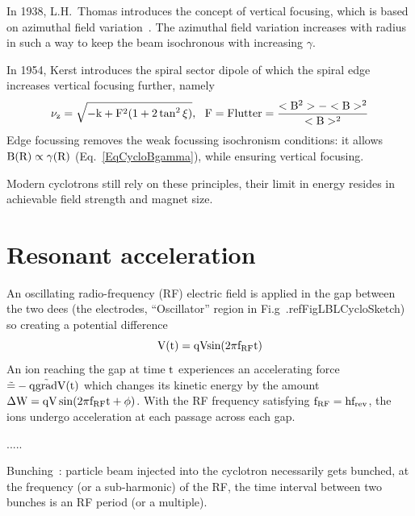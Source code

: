 In 1938, L.H.~Thomas introduces  the concept of vertical focusing, 
which is based on  azimuthal field variation~\cite{LHThomas}. 
The azimuthal field variation increases with radius in such a way to keep the beam isochronous with increasing $\gamma$.

In  1954, Kerst introduces the spiral sector dipole of which the spiral edge increases vertical focusing further, namely
\begin{equation} \rm
\label{EqCycloThomasFoc}
\nu_z = \sqrt{-k + F^2(1 + 2 \tan^2 \xi)}, ~ ~ {\rm F=Flutter} = \frac{<B^2> - <B>^2}{<B>^2}
\end{equation}
Edge focussing removes the weak focussing isochronism conditions: it allows  $\rm B(R)\propto\gamma(R)$ 
 (Eq.~\ref{EqCycloBgamma}), while  ensuring vertical focusing.  

  Modern cyclotrons still  rely on these principles,
their limit in energy resides in achievable field strength and magnet size. 



\section{Resonant acceleration \label{secCycloClassAccel}}

An oscillating radio-frequency (RF) electric field 
is applied in the gap between the two dees (the electrodes, 
 ``Oscillator'' region in Fi.g~.ref{FigLBLCycloSketch})
so creating a potential difference 
\begin{equation} \rm
\label{EqRFCyclo}
 V(t) = qV sin(2\pi f_{\rm RF}t)
\end{equation}
An  ion reaching the gap at time $\rm t$  experiences an accelerating force $\rm \vec = -q \vec{grad}V(t)$ which changes 
its  kinetic energy by the amount $\rm \Delta W = q V \sin(2\pi f_{\rm RF}t + \phi)$. 
With the  RF frequency satisfying $\rm f_{\rm RF} = h f_{\rm rev}$,   the ions undergo acceleration at each passage across each gap. 


.....

     Bunching~: particle beam injected into the cyclotron necessarily gets bunched, at the 
frequency (or a sub-harmonic) of the RF, 
the time interval between two bunches is an RF period (or a multiple).




